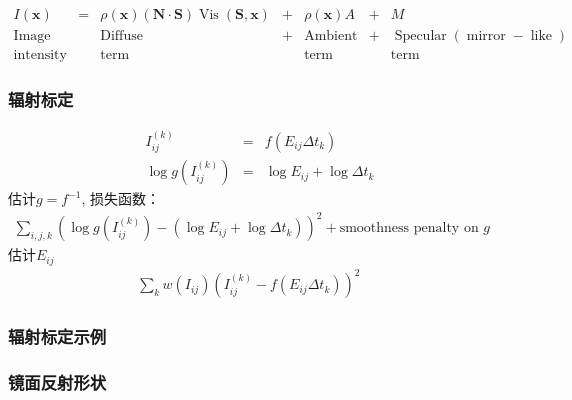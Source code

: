 \documentclass{beamer}
\newcommand{\cdummy}{\cdot}
\newcommand{\nospace}{}
\newcommand{\tmmathbf}[1]{\ensuremath{\boldsymbol{#1}}}
\newcommand{\tmop}[1]{\ensuremath{\operatorname{#1}}}
\begin{document}
{{\begin{frame}
  \
  
  
  \[ \begin{array}{lllllll}
       I (\tmmathbf{x}) & = & \rho (\tmmathbf{x}) (\tmmathbf{N} \cdummy
       \tmmathbf{S}) \tmop{Vis} (\tmmathbf{S}, \tmmathbf{x}) & + & \rho
       (\tmmathbf{x}) A & + & M\\
       \tmop{Image} &  & \tmop{Diffuse} & + & \tmop{Ambient} & + &
       \tmop{Specular} (\tmop{mirror} - \tmop{like})\\
       \tmop{intensity} &  & \tmop{term} &  & \tmop{term} &  & \tmop{term}
     \end{array} \]
\end{frame}

\begin{frame}
  \frametitle{辐射标定}
  
  
  \begin{eqnarray*}
    I^{(k)}_{i \nospace j} & = & f (E_{i \nospace j} \Delta t_k)\\
    \log \nospace g (I_{i \nospace j}^{(k)}) & = & \log \nospace E_{i \nospace
    j} + \log \Delta t_k
  \end{eqnarray*}
  估计$g = f^{- 1}$, 损失函数：
  \begin{eqnarray*}
    \sum_{i, j, k} (\log \nospace g (I_{i \nospace j}^{(k)}) - (\log \nospace
    E_{i \nospace j} + \log \Delta t_k))^2 + \text{smoothness penalty on $g$}
    &  & 
  \end{eqnarray*}
  估计$E_{i \nospace j}$
  \begin{eqnarray*}
    \sum_k w (I_{i \nospace j}) (I^{(k)}_{i \nospace j} - f (E_{i \nospace j}
    \Delta t_k))^2 &  & 
  \end{eqnarray*}
\end{frame}

\begin{frame}
  \frametitle{辐射标定示例}
  
\end{frame}

\begin{frame}
  \frametitle{镜面反射形状}
  
\end{frame}

}}
\end{document}
